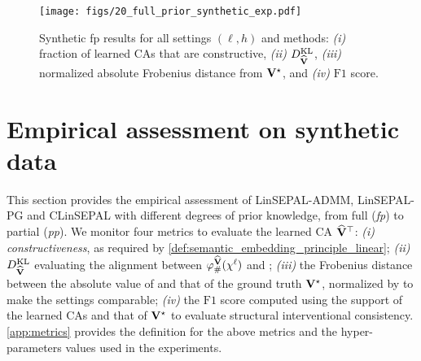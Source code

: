 \begin{figure}[t]
    \centering
    \texttt{[image: figs/20\_full\_prior\_synthetic\_exp.pdf]}
    \caption{
    Synthetic fp results for all settings $(\ell, h)$ and methods: \emph{(i)} fraction of learned CAs that are constructive, \emph{(ii)} $D^{\mathrm{KL}}_{\widehat{\mathbf{V}}}$, \emph{(iii)} normalized  absolute Frobenius distance from $\mathbf{V}^\star$, and \emph{(iv)} $\mathrm{F1}$ score.
    }
    \label{fig:full_synth_data}
\end{figure}
\section{Empirical assessment on synthetic data}\label{sec:empirical_assessment}
This section provides the empirical assessment of LinSEPAL-ADMM, LinSEPAL-PG and CLinSEPAL with different degrees of prior knowledge,
from full (\emph{fp}) to partial (\emph{pp}). 
We monitor four metrics to evaluate the learned CA $\widehat{\mathbf{V}}^\top$:  
\emph{(i)} \emph{constructiveness}, as required by \cref{def:semantic_embedding_principle_linear};  
\emph{(ii)} $D^{\mathrm{KL}}_{\widehat{\mathbf{V}}}$ evaluating the alignment between $\varphi^{\widehat{\mathbf{V}}}_{\#}(\chi^{\ell})$ and \measurehigh; 
\emph{(iii)} the Frobenius distance between the absolute value of \Vhat and that of the ground truth $\mathbf{V}^\star$, normalized by \frob{\V^\star} to make the settings comparable; 
\emph{(iv)} the $\mathrm{F1}$ score computed using the support of the learned CAs and that of $\mathbf{V}^\star$ to evaluate structural interventional consistency.
\cref{app:metrics} provides the definition for the above metrics and the hyper-parameters values used in the experiments.

